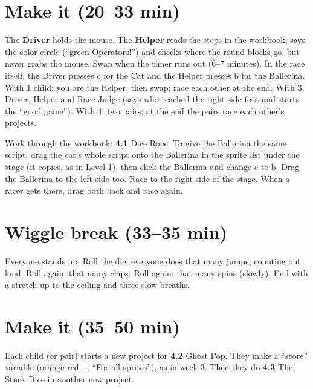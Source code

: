 \section{Make it (20--33 min)}
\begin{pairroles}
The \textbf{Driver} holds the mouse. The \textbf{Helper} reads the steps in the workbook, says the color circle (\enquote{green Operators!}) and checks where the round blocks go, but never grabs the mouse. Swap when the timer runs out (6--7 minutes). In the race itself, the Driver presses c for the Cat and the Helper presses b for the Ballerina. With 1 child: you are the Helper, then swap; race each other at the end. With 3: Driver, Helper and Race Judge (says who reached the right side first and starts the \enquote{good game}). With 4: two pairs; at the end the pairs race each other's projects.
\end{pairroles}

Work through the workbook: \textbf{4.1} Dice Race. To give the Ballerina the same script, drag the cat's whole script onto the Ballerina in the sprite list under the stage (it copies, as in Level 1), then click the Ballerina and change c to b. Drag the Ballerina to the left side too. Race to the right side of the stage. When a racer gets there, drag both back and race again.

\section{Wiggle break (33--35 min)}
Everyone stands up. Roll the die: everyone does that many jumps, counting out loud. Roll again: that many claps. Roll again: that many spins (slowly). End with a stretch up to the ceiling and three slow breaths.

\section{Make it (35--50 min)}
Each child (or pair) starts a new project for \textbf{4.2} Ghost Pop. They make a \enquote{score} variable (orange-red , , \enquote{For all sprites}), as in week 3. Then they do \textbf{4.3} The Stuck Dice in another new project.

